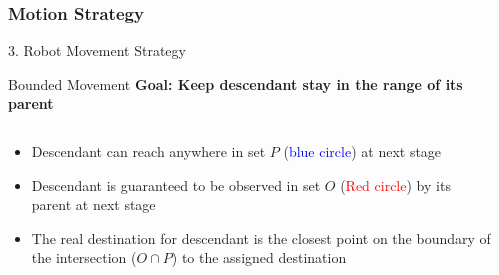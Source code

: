 \documentclass[10pt]{beamer}
\begin{document}
\subsubsection[Algorithm: Motion]{Motion Strategy}
\begin{frame}{3. Robot Movement Strategy}{}
  
\end{frame}
\begin{frame}{Bounded Movement}{}
  \textbf{Goal: Keep descendant stay in the range of its parent}
    \begin{columns}[T] %
      \begin{column}{.5\textwidth}
        \begin{itemize}
        \item \small{Descendant can reach anywhere in set $P$
            (\textcolor{blue}{blue circle}) at next stage}
        \item \small{Descendant is guaranteed to be observed in set $O$
            (\textcolor{red}{Red circle}) by its parent at next stage}
        \item \small{The real destination for descendant is the closest point
            on the boundary of the intersection ($O\cap P$) to the
            assigned destination}
        \end{itemize}
      \end{column}%
      \begin{column}{.4\textwidth}
             
      \end{column}%
    \end{columns} 
\end{frame}
\end{document}
